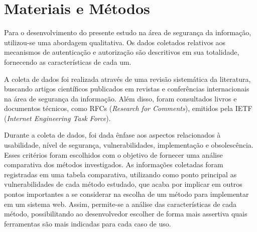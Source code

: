 \section{Materiais e Métodos}

Para o desenvolvimento do presente estudo na área de segurança da informação,  utilizou-se uma 
abordagem qualitativa. Os dados coletados relativos aos mecanismos de autenticação e autorização 
são descritivos em sua totalidade, fornecendo as características de cada um.

A coleta de dados foi realizada através de uma revisão sistemática da literatura, buscando artigos 
científicos publicados em revistas e conferências internacionais na área de segurança da informação.
Além disso, foram consultados livros e documentos técnicos, como RFCs 
(\emph{Research for Comments}), emitidos pela IETF (\emph{Internet Engineering Task Force}).

Durante a coleta de dados, foi dada ênfase aos aspectos relacionados à usabilidade, nível de 
segurança, vulnerabilidades, implementação e obsolescência. Esses critérios foram escolhidos com o 
objetivo de fornecer uma análise comparativa dos métodos investigados. As informações coletadas 
foram registradas em uma tabela comparativa, utilizando como ponto principal as vulnerabilidades
de cada método estudado, que acaba por implicar em outros pontos importantes a se considerar na
escolha de um método para implementar em um sistema web. Assim, permite-se a análise das 
características de cada método, possibilitando ao desenvolvedor escolher de forma mais assertiva quais ferramentas são mais indicadas para cada caso de 
uso.




